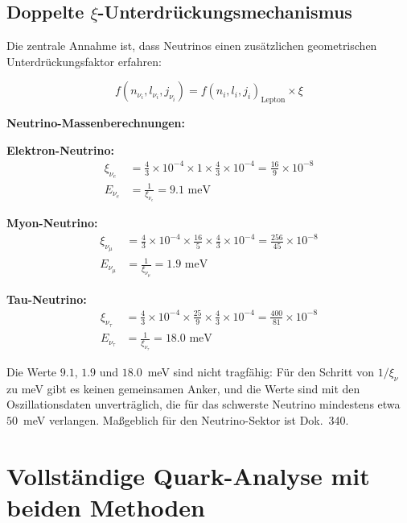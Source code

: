 	\subsection{Doppelte $\xi$-Unterdrückungsmechanismus}
	\label{subsec:double_xi_suppression}
	
	Die zentrale Annahme ist, dass Neutrinos einen zusätzlichen geometrischen Unterdrückungsfaktor erfahren:
	
	\begin{equation}
		f(n_{\nu_i}, l_{\nu_i}, j_{\nu_i}) = f(n_i, l_i, j_i)_{\text{Lepton}} \times \xi
		\label{eq:neutrino_suppression}
	\end{equation}
	
	\textbf{Neutrino-Massenberechnungen:}
	
	\textbf{Elektron-Neutrino:}
	\begin{align}
		\xi_{\nu_e} &= \frac{4}{3} \times 10^{-4} \times 1 \times \frac{4}{3} \times 10^{-4} = \frac{16}{9} \times 10^{-8} \\
		E_{\nu_e} &= \frac{1}{\xi_{\nu_e}} = 9.1 \text{ meV}
	\end{align}
	
	\textbf{Myon-Neutrino:}
	\begin{align}
		\xi_{\nu_\mu} &= \frac{4}{3} \times 10^{-4} \times \frac{16}{5} \times \frac{4}{3} \times 10^{-4} = \frac{256}{45} \times 10^{-8} \\
		E_{\nu_\mu} &= \frac{1}{\xi_{\nu_\mu}} = 1.9 \text{ meV}
	\end{align}
	
	\textbf{Tau-Neutrino:}
	\begin{align}
		\xi_{\nu_\tau} &= \frac{4}{3} \times 10^{-4} \times \frac{25}{9} \times \frac{4}{3} \times 10^{-4} = \frac{400}{81} \times 10^{-8} \\
		E_{\nu_\tau} &= \frac{1}{\xi_{\nu_\tau}} = 18.0 \text{ meV}
	\end{align}
	
	Die Werte $9.1$, $1.9$ und $18.0$~meV sind nicht tragfähig: Für den Schritt von $1/\xi_\nu$ zu meV gibt es keinen gemeinsamen Anker, und die Werte sind mit den Oszillationsdaten unverträglich, die für das schwerste Neutrino mindestens etwa $50$~meV verlangen. Maßgeblich für den Neutrino-Sektor ist Dok.~340.
	
	\section{Vollständige Quark-Analyse mit beiden Methoden}
	\label{sec:quark_analyse}
	
